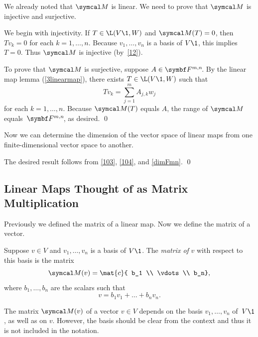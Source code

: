 
\proof
We already noted that $\M$ is linear. We need to prove that $\M$ is
injective and surjective.

We begin with injectivity.  If $T \in  \L(V\1,W)$ and $\M(T) = 0$, then $Tv_k = 0$ for each
$k = 1, \dots, n$.  Because $v_1, \dots, v_n$ is a basis of $V\1$, this implies
$T = 0$.  Thus $\M$ is injective (by~\ref{12}).

To prove that $\M$ is surjective, suppose $A \in \FF{m,n}$.  By the linear map lemma (\ref{3linearmap}), there exists $T \in \L(V\1,W)$ such that
\[
Tv_k = \sum_{j=1}^m A_{j,k}w_j
\]
for each $k = 1, \dots, n$. Because $\M(T)$ equals $A$, the range of $\M$ equals~$\FF{m,n}$,  as desired.
\qed

Now we can determine the dimension of the vector space of linear maps from
one finite-dimensional vector space to another.


\proof
The desired result follows from \ref{103}, \ref{104}, and \ref{dimFmn}.
\qed

\subsection{Linear Maps Thought of as Matrix Multiplication}

Previously we defined the matrix of a linear map. Now we define the matrix of a vector.

{Suppose $v \in V$ and $v_1, \dots, v_n$ is a basis of $V\1$. The \emph{matrix of} $v$ with respect to this basis is the  matrix
\[
\M(v) =
\mat{c}{
b_1 \\
\vdots \\
b_n},
\]
where $b_1, \dots, b_n$ are the scalars such that
\[
v = b_1 v_1 + \dots + b_n v_n.
\]
}

The matrix $\M(v)$ of a vector $v \in V$ depends on the basis $v_1, \dots, v_n$ of~$V\1$, as well as on $v$. However, the basis should be clear from the context and thus it is not included in the notation.

